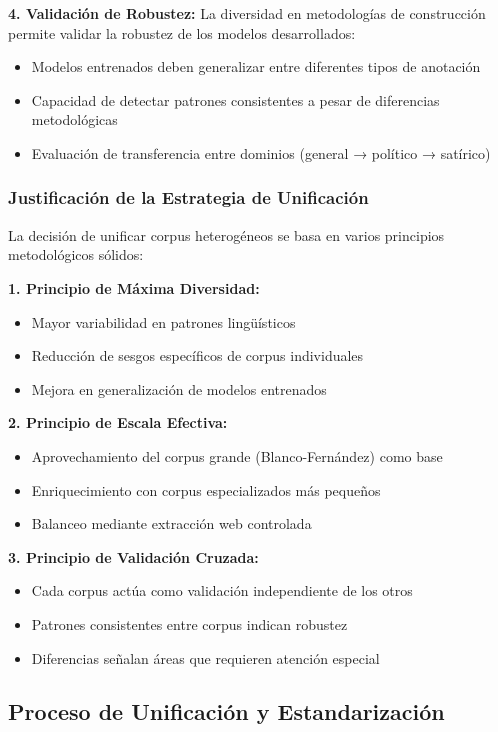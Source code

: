 \textbf{4. Validación de Robustez:}
La diversidad en metodologías de construcción permite validar la robustez de los modelos desarrollados:
\begin{itemize}
    \item Modelos entrenados deben generalizar entre diferentes tipos de anotación
    \item Capacidad de detectar patrones consistentes a pesar de diferencias metodológicas
    \item Evaluación de transferencia entre dominios (general → político → satírico)
\end{itemize}

\subsubsection{Justificación de la Estrategia de Unificación}

La decisión de unificar corpus heterogéneos se basa en varios principios metodológicos sólidos:

\textbf{1. Principio de Máxima Diversidad:}
\begin{itemize}
    \item Mayor variabilidad en patrones lingüísticos
    \item Reducción de sesgos específicos de corpus individuales
    \item Mejora en generalización de modelos entrenados
\end{itemize}

\textbf{2. Principio de Escala Efectiva:}
\begin{itemize}
    \item Aprovechamiento del corpus grande (Blanco-Fernández) como base
    \item Enriquecimiento con corpus especializados más pequeños
    \item Balanceo mediante extracción web controlada
\end{itemize}

\textbf{3. Principio de Validación Cruzada:}
\begin{itemize}
    \item Cada corpus actúa como validación independiente de los otros
    \item Patrones consistentes entre corpus indican robustez
    \item Diferencias señalan áreas que requieren atención especial
\end{itemize}

\subsection{Proceso de Unificación y Estandarización}

